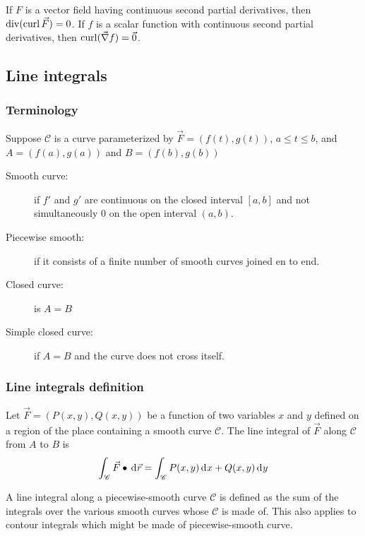 \documentclass[10pt, twocolumn]{article}
\theoremstyle{remark}
\begin{document}
If \(F\) is a vector field having continuous second partial derivatives, then \(\mathrm{div}(\mathrm{curl}\,\vec{F}) = 0\).
If \(f\) is a scalar function with continuous second partial derivatives, then \(\mathrm{curl}(\vec{\nabla}f) = \vec{0}\).

\subsection{Line integrals}
\subsubsection*{Terminology}
Suppose \(\mathscr{C}\) is a curve parameterized by \(\vec{F} = \left( f(t), g(t) \right)\), \(a \leqslant t \leqslant b\), and \(A = \left( f(a), g(a) \right)\) and \(B = \left( f(b), g(b) \right)\)
\begin{description}
  \item[Smooth curve:] if \(f'\) and \(g'\) are continuous on the closed interval \([a, b]\) and not simultaneously 0 on the open interval \((a, b)\).
  \item[Piecewise smooth:] if it consists of a finite number of smooth curves joined en to end.
  \item[Closed curve:] is \(A = B\)
  \item[Simple closed curve:] if \(A = B\) and the curve does not cross itself.
\end{description}

\subsubsection*{Line integrals definition}
Let \(\vec{F} = \left( P(x, y), Q(x, y) \right)\) be a function of two variables \(x\) and \(y\) defined on a region of the place containing a smooth curve \(\mathscr{C}\).
The line integral of \(\vec{F}\) along \(\mathscr{C}\) from \(A\) to \(B\) is
\[
  \int_{\mathscr{C}}{\vec{F} \bullet \,\mathrm{d}^{} \vec{r}} = \int_{\mathscr{C}}{ P(x, y) \,\mathrm{d}^{} x + Q(x, y) \,\mathrm{d}^{} y}
\]

A line integral along a piecewise-smooth curve \(\mathscr{C}\) is defined as the sum of the integrals over the various smooth curves whose \(\mathscr{C}\) is made of.
This also applies to contour integrals which might be made of piecewise-smooth curve.
\end{document}
